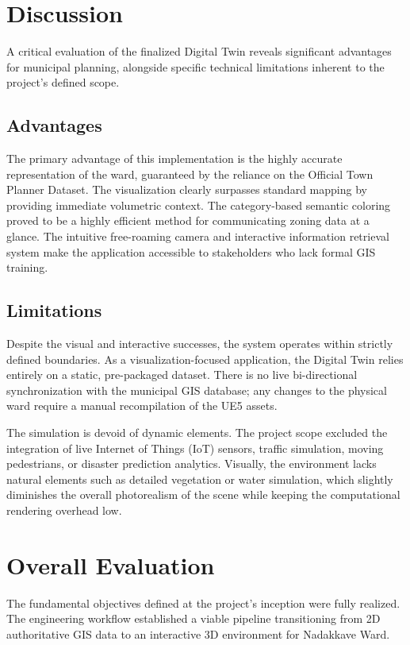 \section{Discussion}
A critical evaluation of the finalized Digital Twin reveals significant advantages for municipal planning, alongside specific technical limitations inherent to the project's defined scope.

\subsection{Advantages}
The primary advantage of this implementation is the highly accurate representation of the ward, guaranteed by the reliance on the Official Town Planner Dataset. The visualization clearly surpasses standard mapping by providing immediate volumetric context. The category-based semantic coloring proved to be a highly efficient method for communicating zoning data at a glance. The intuitive free-roaming camera and interactive information retrieval system make the application accessible to stakeholders who lack formal GIS training.

\subsection{Limitations}
Despite the visual and interactive successes, the system operates within strictly defined boundaries. As a visualization-focused application, the Digital Twin relies entirely on a static, pre-packaged dataset. There is no live bi-directional synchronization with the municipal GIS database; any changes to the physical ward require a manual recompilation of the UE5 assets. 

The simulation is devoid of dynamic elements. The project scope excluded the integration of live Internet of Things (IoT) sensors, traffic simulation, moving pedestrians, or disaster prediction analytics. Visually, the environment lacks natural elements such as detailed vegetation or water simulation, which slightly diminishes the overall photorealism of the scene while keeping the computational rendering overhead low.

\section{Overall Evaluation}
The fundamental objectives defined at the project's inception were fully realized. The engineering workflow established a viable pipeline transitioning from 2D authoritative GIS data to an interactive 3D environment for Nadakkave Ward. 


